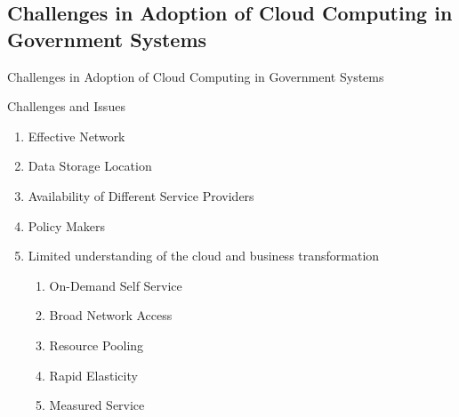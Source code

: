 \subsection{Challenges in Adoption of Cloud Computing in Government Systems}

\begin{frame}{Challenges in Adoption of Cloud Computing in Government Systems}
    \begin{alertblock}
         {Challenges and Issues}
         \begin{enumerate}
             \item Effective Network
             \item Data Storage Location
             \item Availability of Different Service Providers
             \item Policy Makers
             \item Limited understanding of the cloud and business transformation
             \begin{enumerate}
                 \item On-Demand Self Service
                 \item Broad Network Access
                 \item Resource Pooling
                 \item Rapid Elasticity
                 \item Measured Service
             \end{enumerate}
         \end{enumerate}
    \end{alertblock}
\end{frame}




    


